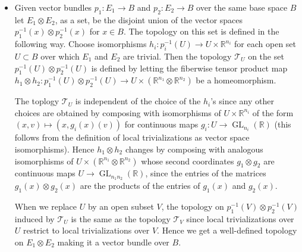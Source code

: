 \documentclass{article}
\newcommand{\R}{\mathbb{R}}
\newcommand{\Tc}{\mathcal{T}}
\DeclareMathOperator{\GL}{GL}
\begin{document}
\begin{defn}
\begin{itemize}
		\item Given vector bundles $p_1:E_1\to B$ and $p_2:E_2\to B$ over the same base space $B$ let $E_1\otimes E_2$, as a set, be the disjoint union of the vector spaces $p_1^{-1}(x)\otimes p_2^{-1}(x)$ for $x\in B$. The topology on this set is defined in the following way. Choose isomorphisms $h_i:p_i^{-1}(U)\to U\times\R^{n_i}$ for each open set $U\subset B$ over which $E_1$ and $E_2$ are trivial. Then the topology $\Tc_U$ on the set $p_1^{-1}(U)\otimes p_2^{-1}(U)$ is defined by letting the fiberwise tensor product map $h_1\otimes h_2:p_1^{-1}(U)\otimes p_2^{-1}(U)\to U\times (\R^{n_1}\otimes\R^{n_2})$ be a homeomorphism.
		
		The toplogy $\Tc_U$ is independent of the choice of the $h_i$'s since any other choices are obtained by composing with isomorphisms of $U\times\R^{n_i}$ of the form $(x,v)\mapsto(x,g_i(x)(v))$ for continuous maps $g_i:U\to \GL_{n_i}(\R)$ {\color{cyan}(this follows from the definition of local trivializations as vector space isomorphisms)}. Hence $h_1\otimes h_2$ changes by composing with analogous isomorphisms of $U\times (\R^{n_1}\otimes\R^{n_2})$ whose second coordinates $g_1\otimes g_2$ are continuous maps $U\to\GL_{n_1n_2}(\R)$, since the entries of the matrices $g_1(x)\otimes g_2(x)$ are the products of the entries of $g_1(x)$ and $g_2(x)$.
		
		When we replace $U$ by an open subset $V$, the topology on $p_1^{-1}(V)\otimes p_2^{-1}(V)$ induced by $\Tc_U$ is the same as the topology $\Tc_V$ since local trivializations over $U$ restrict to local trivializations over $V$. Hence we get a well-defined topology on $E_1\otimes E_2$ making it a vector bundle over $B$.
	\end{itemize}
\end{defn}
\end{document}
